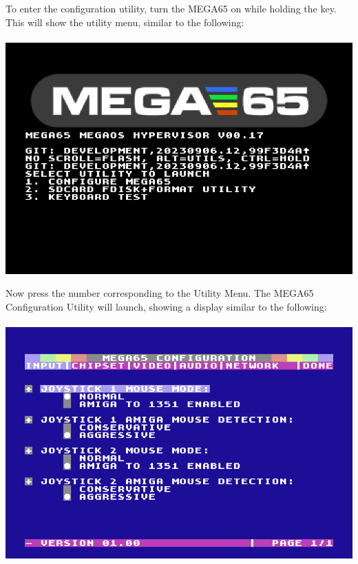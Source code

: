 \begin{minipage}{\linewidth}
  To enter the configuration utility, turn the MEGA65 on while
  holding the  key.  This will show the utility menu,
  similar to the following: \\
  \\
  \includegraphics[width=\linewidth]{images/ss-utilmenu.png}
\end{minipage}

\begin{minipage}{\linewidth}
  Now press the number corresponding to the Utility Menu.  The MEGA65
  Configuration Utility will launch, showing a display similar to
  the following: \\
  \\
  \includegraphics[width=\linewidth]{images/ss-m65config-1.png}
\end{minipage}

